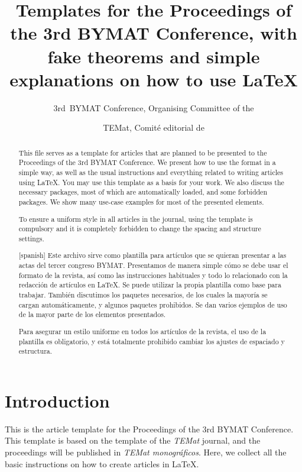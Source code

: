 \documentclass[babel-main=english]{TEMat-article}
\title[Template for the Proceedings of the 3rd BYMAT Conference]{Templates for the Proceedings of the 3rd BYMAT Conference, with fake theorems and simple explanations on how to use \LaTeX{}}
\author*{3rd~BYMAT Conference, Organising Committee of the}
\affiliation{BYMAT}
\author{TEMat, Comité editorial de}
\affiliation{Asociación Nacional de Estudiantes de Matemáticas (ANEM)}
\begin{document}
\begin{abstract}
This file serves as a template for articles that are planned to be presented to the Proceedings of the 3rd BYMAT Conference. We present how to use the format in a simple way, as well as the usual instructions and everything related to writing articles using \LaTeX.
You may use this template as a basis for your work.
We also discuss the necessary packages, most of which are automatically loaded, and some forbidden packages.
We show many use-case examples for most of the presented elements.

To ensure a uniform style in all articles in the journal, using the template is compulsory and it is completely forbidden to change the spacing and structure settings.
\end{abstract}

\begin{abstract}[spanish]
Este archivo sirve como plantilla para artículos que se quieran presentar a las actas del tercer congreso BYMAT.
Presentamos de manera simple cómo se debe usar el formato de la revista, así como las instrucciones habituales y todo lo relacionado con la redacción de artículos en \LaTeX.
Se puede utilizar la propia plantilla como base para trabajar.
También discutimos los paquetes necesarios, de los cuales la mayoría se cargan automáticamente, y algunos paquetes prohibidos.
Se dan varios ejemplos de uso de la mayor parte de los elementos presentados.

Para asegurar un estilo uniforme en todos los artículos de la revista, el uso de la plantilla es obligatorio, y está totalmente prohibido cambiar los ajustes de espaciado y estructura.
\end{abstract}

\maketitle %

\section{Introduction}

This is the article template for the Proceedings of the 3rd BYMAT Conference.
This template is based on the template of the \emph{TEMat} journal, and the proceedings will be published in \emph{TEMat monográficos}.
Here, we collect all the basic instructions on how to create articles in \LaTeX{}.
\end{document}
